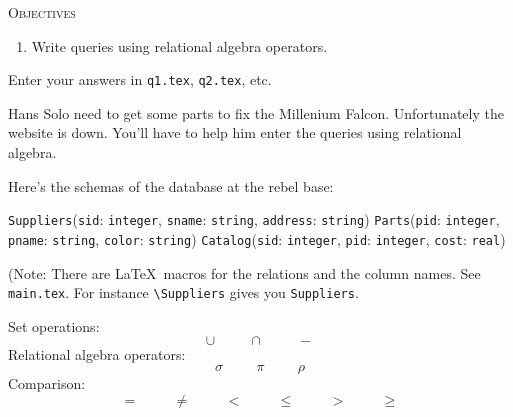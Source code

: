 


\renewcommand\TITLE{Assignment 6}


\topmatter

\textsc{Objectives}
\begin{enumerate}
\item Write queries using relational algebra operators.
\end{enumerate}

\newcommand\stringtype{\texttt{string}}
\newcommand\integertype{\texttt{integer}}
\newcommand\realtype{\texttt{real}}

\newcommand\Suppliers{\texttt{Suppliers}}
\newcommand\Parts{\texttt{Parts}}
\newcommand\Catalog{\texttt{Catalog}}
\newcommand\sid{\texttt{sid}}
\newcommand\sname{\texttt{sname}}
\newcommand\pid{\texttt{pid}}
\newcommand\pname{\texttt{pname}}
\newcommand\mycolor{\texttt{color}}
\newcommand\cost{\texttt{cost}}
\newcommand\address{\texttt{address}}

Enter your answers in \verb!q1.tex!, \verb!q2.tex!, etc.

Hans Solo need to get some parts to fix the Millenium Falcon.
Unfortunately the website is down.
You'll have to help him enter the queries using relational algebra.

Here's the schemas of the database at the rebel base:

\begin{console}[commandchars=\\\{\},frame=none,fontsize=\normalsize]
    \Suppliers(\sid: \integertype, \sname: \stringtype, \address: \stringtype)
    \Parts(\pid: \integertype, \pname: \stringtype, \mycolor: \stringtype)
    \Catalog(\sid: \integertype, \pid: \integertype, \cost: \realtype)
\end{console}

(Note: There are \LaTeX\ macros for the
relations and the column names.
See \verb!main.tex!.
For instance \verb!\Suppliers! gives you \Suppliers.

Set operations:
\[
 \cup  \hspace{1cm}
 \cap  \hspace{1cm}
 - 
\]
Relational algebra operators:
\[
\sigma \hspace{1cm}
\pi    \hspace{1cm}
\rho
\]
Comparison:
\[
=     \hspace{1cm}
\neq  \hspace{1cm}
<     \hspace{1cm}
\leq  \hspace{1cm}
>     \hspace{1cm}
\geq
\]

